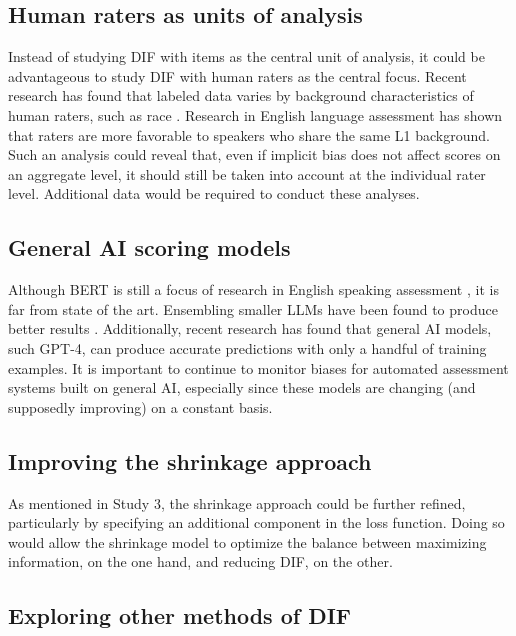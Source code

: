 \documentclass [PhD] {uclathes}
\begin{document}
\subsection{Human raters as units of analysis}

Instead of studying DIF with items as the central unit of analysis, it could be advantageous to study DIF with human raters as the central focus. Recent research has found that labeled data varies by background characteristics of human raters, such as race \citep{prabhakaran2021releasing}. Research in English language assessment has shown that raters are more favorable to speakers who share the same L1 background. Such an analysis could reveal that, even if implicit bias does not affect scores on an aggregate level, it should still be taken into account at the individual rater level. Additional data would be required to conduct these analyses. 

\subsection{General AI scoring models}

Although BERT is still a focus of research in English speaking assessment \citep[e.g.][]{wang2021automated}, it is far from state of the art. Ensembling smaller LLMs have been found to produce better results \citep{ormerod2021automated}. Additionally, recent research has found that general AI models, such GPT-4, can produce accurate predictions with only a handful of training examples. It is important to continue to monitor biases for automated assessment systems built on general AI, especially since these models are changing (and supposedly improving) on a constant basis.  

\subsection{Improving the shrinkage approach}

As mentioned in Study 3, the shrinkage approach could be further refined, particularly by specifying an additional component in the loss function. Doing so would allow the shrinkage model to optimize the balance between maximizing information, on the one hand, and reducing DIF, on the other.

\subsection{Exploring other methods of DIF}
\end{document}
